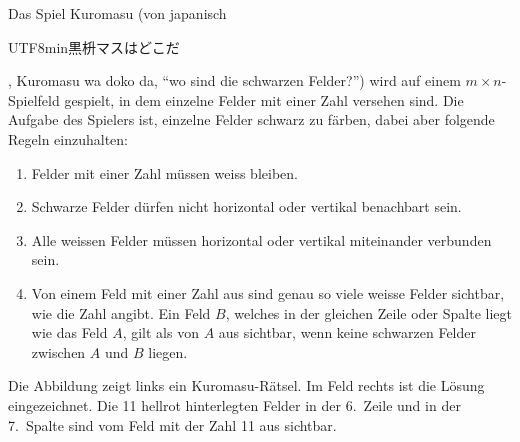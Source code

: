 Das Spiel Kuromasu (von japanisch
\begin{CJK}{UTF8}{min}黒枡マスはどこだ\end{CJK}, Kuromasu wa doko da,
``wo sind die schwarzen Felder?'')
wird auf einem $m\times n$-Spielfeld gespielt, in dem einzelne Felder
mit einer Zahl versehen sind.
Die Aufgabe des Spielers ist, einzelne Felder schwarz zu färben,
dabei aber folgende Regeln einzuhalten:
\begin{enumerate}
\item
Felder mit einer Zahl müssen weiss bleiben.
\item
Schwarze Felder dürfen nicht horizontal oder vertikal benachbart sein.
\item
Alle weissen Felder müssen horizontal oder vertikal miteinander
verbunden sein.
\item
Von einem Feld mit einer Zahl aus sind genau so viele weisse Felder
sichtbar, wie die Zahl angibt.
Ein Feld $B$, welches in der gleichen Zeile oder Spalte liegt wie das Feld $A$,
gilt als von $A$ aus sichtbar, wenn keine schwarzen Felder
zwischen $A$ und $B$ liegen.
\end{enumerate}
Die Abbildung zeigt links ein Kuromasu-Rätsel.
Im Feld rechts ist die Lösung eingezeichnet.
Die 11 hellrot hinterlegten Felder in der 6.~Zeile und in der 7.~Spalte
sind vom Feld mit der Zahl 11 aus sichtbar.
\begin{center}
\def\punkt#1#2{ ({0.6*(#1)},{0.6*(#2)}) }
\def\zahl#1#2#3{
	\draw \punkt{#1+0.5}{#2+0.5} circle[radius=0.28];
	\node at \punkt{#1+0.5}{#2+0.46} {$#3\mathstrut$};
}
\def\zahlen{
	\zahl{0}{2}{7}
	\zahl{0}{7}{9}
	\zahl{1}{6}{10}
	\zahl{2}{0}{2}
	\zahl{2}{1}{7}
	\zahl{2}{5}{12}
	\zahl{2}{10}{9}
	\zahl{4}{5}{8}
	\zahl{4}{8}{12}
	\zahl{6}{2}{2}
	\zahl{6}{5}{11}
	\zahl{8}{0}{5}
	\zahl{8}{5}{3}
	\zahl{8}{9}{7}
	\zahl{8}{10}{8}
	\zahl{9}{4}{3}
	\zahl{10}{3}{3}
	\zahl{10}{8}{16}
}
\def\schwarz#1#2{
	\fill[color=gray!60] \punkt{#1}{#2} rectangle \punkt{#1+1}{#2+1};
}
\def\feld{
	\draw \punkt{0}{0} rectangle \punkt{11}{11};
	\foreach \i in {1,...,10}{
		\draw \punkt{\i}{0} -- \punkt{\i}{11};
		\draw \punkt{0}{\i} -- \punkt{11}{\i};
	}
	\zahlen
}
\end{center}
